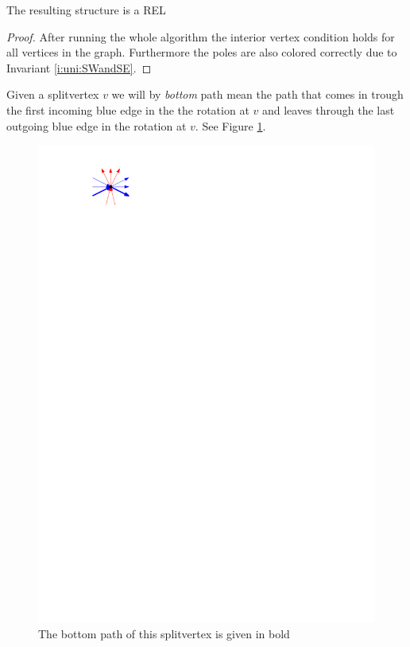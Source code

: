     \begin{lemma}
      \label{lm:sweep:REL}
      The resulting structure is a REL
    \end{lemma}

    \begin{proof}
      After running the whole algorithm the interior vertex condition holds for all vertices in the graph. Furthermore the poles are also colored correctly due to Invariant \ref{i:uni:SWandSE}.
    \end{proof}

    Given a splitvertex $v$ we will by \emph{bottom} path mean the path that comes in trough the first incoming blue edge in the the rotation at $v$ and leaves through the last outgoing blue edge in the rotation at $v$. See Figure \ref{fig:sweep:bottomPath}.

    \begin{figure}[h]
      \centering
      \includegraphics[scale=1]{unifiedAlgo/img/sweep/bottompath.pdf}
      \caption{The bottom path of this splitvertex is given in bold}
      \label{fig:sweep:bottomPath}
    \end{figure}

